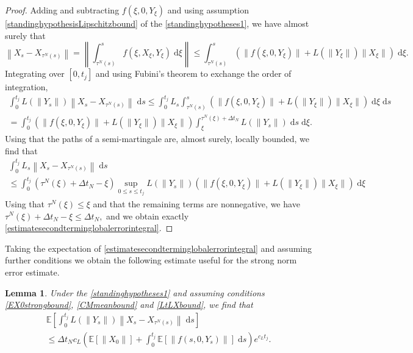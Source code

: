 \documentclass[reqno,12pt]{amsart}
\theoremstyle{plain} %
\newtheorem{lemma}{Lemma}[section]
\theoremstyle{definition} %
\begin{document}
\begin{proof}
    Adding and subtracting $f(\xi, 0, Y_\xi)$ and using assumption \eqref{standinghypothesisLipschitzbound} of the \cref{standinghypotheses1}, we have almost surely that
    \[
      \left\|X_s - X_{\tau^N(s)}\right\| = \left\|\int_{\tau^N(s)}^s f(\xi, X_\xi, Y_\xi)\;\mathrm{d}\xi\right\| \leq \int_{\tau^N(s)}^s \left(\|f(\xi, 0, Y_\xi)\| + L(\|Y_\xi\|)\|X_\xi\|\right)\;\mathrm{d}\xi.
    \]
    Integrating over $[0, t_j]$ and using Fubini's theorem to exchange the order of integration,
    \begin{multline*}
        \int_0^{t_j}L(\|Y_s\|) \left\|X_s - X_{\tau^N(s)}\right\| \;\mathrm{d}s \leq \int_0^{t_j}L_s\int_{\tau^N(s)}^s (\|f(\xi, 0, Y_\xi)\| + L(\|Y_\xi\|)\|X_\xi\|) \;\mathrm{d}\xi \;\mathrm{d}s \\
        = \int_0^{t_j}(\|f(\xi, 0, Y_\xi)\| + L(\|Y_\xi\|)\|X_\xi\|) \int_\xi^{\tau^N(\xi) + \Delta t_N} L(\|Y_s\|)\;\mathrm{d}s \;\mathrm{d}\xi.
    \end{multline*}
    Using that the paths of a semi-martingale are, almost surely, locally bounded, we find that
    \begin{multline*}
        \int_0^{t_j}L_s\left\|X_s - X_{\tau^N(s)}\right\| \;\mathrm{d}s \\
        \leq \int_0^{t_j} (\tau^N(\xi) + \Delta t_N - \xi) \sup_{0\leq s \leq t_j}L(\|Y_s\|)(\|f(\xi, 0, Y_\xi)\| + L(\|Y_\xi\|)\|X_\xi\|) \;\mathrm{d}\xi
    \end{multline*}
    Using that $\tau^N(\xi) \leq \xi$ and that the remaining terms are nonnegative, we have $\tau^N(\xi) + \Delta t_N - \xi \leq \Delta t_N,$ and we obtain exactly \eqref{estimatesecondterminglobalerrorintegral}.
\end{proof}

Taking the expectation of \eqref{estimatesecondterminglobalerrorintegral} and assuming further conditions we obtain the following estimate useful for the strong norm error estimate.

\begin{lemma}
    Under the \cref{standinghypotheses1} and assuming conditions \eqref{EX0strongbound}, \eqref{CMmeanbound} and \eqref{LtLXbound}, we find that
    \begin{multline}
        \label{estimatesecondterminglobalstrongerrorintegral}
        \mathbb{E}\left[\int_0^{t_j}L(\|Y_s\|)\left\|X_s - X_{\tau^N(s)}\right\| \;\mathrm{d}s\right] \\
        \leq \Delta t_N c_L \left(\mathbb{E}[\|X_0\|] + \int_0^{t_j} \mathbb{E}[\|f(s, 0, Y_s)\|]\;\mathrm{d}s\right) e^{c_L t_j}.
    \end{multline}
\end{lemma}
\end{document}
